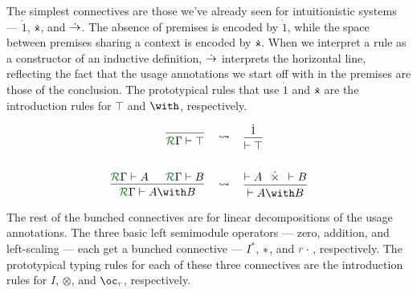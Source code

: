 The simplest connectives are those we've already seen for intuitionistic
systems --- $\dot1$, $\dottimes$, and $\mathrel{\dot\to}$.
The absence of premises is encoded by $\dot1$, while the space between premises
sharing a context is encoded by $\dottimes$.
When we interpret a rule as a constructor of an inductive definition, $\mathrel{\dot\to}$
interprets the horizontal line, reflecting the fact that the usage annotations
we start off with in the premises are those of the conclusion.
The prototypical rules that use $\dot1$ and $\dottimes$ are the introduction
rules for $\top$ and $\with$, respectively.

\begin{align*}
  \begin{prooftree}
    \infer0{\grR\Gamma \vdash \top}
  \end{prooftree}
  &\quad\rightsquigarrow\quad
  \begin{prooftree}
    \set{separation=0.75em}
    \hypo{\dot1}
    \infer1{\vdash \top}
  \end{prooftree}
  \\\\
  \begin{prooftree}
    \hypo{\grR\Gamma \vdash A}
    \hypo{\grR\Gamma \vdash B}
    \infer2{\grR\Gamma \vdash A \with B}
  \end{prooftree}
  &\quad\rightsquigarrow\quad
  \begin{prooftree}
    \set{separation=0.75em}
    \hypo{\vdash A}
    \hypo{\dottimes}
    \hypo{\vdash B}
    \infer3{\vdash A \with B}
  \end{prooftree}
\end{align*}

The rest of the bunched connectives are for linear decompositions of the usage
annotations.
The three basic left semimodule operators --- zero, addition, and left-scaling
--- each get a bunched connective --- $I^*$, $\mathbin{*}$, and $\gr r \cdot {}$,
respectively.
The prototypical typing rules for each of these three connectives are the
introduction rules for $I$, $\otimes$, and $\oc_{\gr r}$, respectively.

